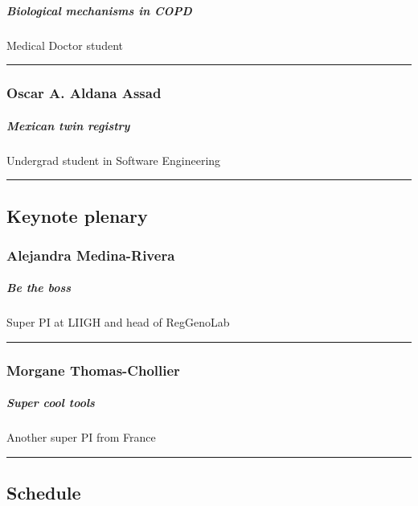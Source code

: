 \documentclass[]{article}
\let\oldsubparagraph\subparagraph
\renewcommand{\subparagraph}[1]{\oldsubparagraph{#1}\mbox{}}
\begin{document}
\subparagraph{ Biological mechanisms in
COPD}\label{biological-mechanisms-in-copd}

Medical Doctor student

\begin{center}\rule{0.5\linewidth}{\linethickness}\end{center}

\subsubsection{Oscar A. Aldana Assad}\label{oscar-a.-aldana-assad}

\subparagraph{ Mexican twin registry}\label{mexican-twin-registry}

Undergrad student in Software Engineering

\begin{center}\rule{0.5\linewidth}{\linethickness}\end{center}

\subsection{Keynote plenary}\label{keynote-plenary}

\subsubsection{Alejandra Medina-Rivera}\label{alejandra-medina-rivera}

\subparagraph{ Be the boss}\label{be-the-boss}

Super PI at LIIGH and head of RegGenoLab

\begin{center}\rule{0.5\linewidth}{\linethickness}\end{center}

\subsubsection{Morgane Thomas-Chollier}\label{morgane-thomas-chollier}

\subparagraph{ Super cool tools}\label{super-cool-tools}

Another super PI from France

\begin{center}\rule{0.5\linewidth}{\linethickness}\end{center}

\subsection{Schedule}\label{schedule}
\end{document}
